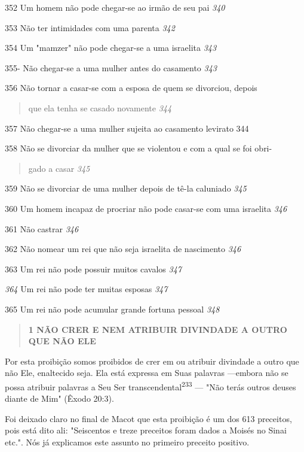 352 Um homem não pode chegar-se ao irmão de seu pai \emph{340}

353 Não ter intimidades com uma parenta \emph{342}

354 Um "mamzer" não pode chegar-se a uma israelita \emph{343}

355- Não chegar-se a uma mulher antes do casamento \emph{343}

356 Não tornar a casar-se com a esposa de quem se divorciou, depois

\begin{quote}
que ela tenha se casado novamente \emph{344}
\end{quote}

357 Não chegar-se a uma mulher sujeita ao casamento levirato 344

358 Não se divorciar da mulher que se violentou e com a qual se foi
obri-

\begin{quote}
gado a casar \emph{345}
\end{quote}

359 Não se divorciar de uma mulher depois de tê-la caluniado \emph{345}

360 Um homem incapaz de procriar não pode casar-se com uma israelita
\emph{346}

361 Não castrar \emph{346}

362 Não nomear um rei que não seja israelita de nascimento \emph{346}

363 Um rei não pode possuir muitos cavalos \emph{347}

\emph{364} Um rei não pode ter muitas esposas \emph{347}

365 Um rei não pode acumular grande fortuna pessoal \emph{348}

\begin{quote}
\textbf{1 NÃO CRER E NEM ATRIBUIR DIVINDADE A OUTRO QUE NÃO ELE}
\end{quote}

Por esta proibição somos proibidos de crer em ou atribuir divinda­de a
outro que não Ele, enaltecido seja. Ela está expressa em Suas palavras
---embora não se possa atribuir palavras a Seu Ser
transcendental\textsuperscript{233} --- "Não te­rás outros deuses diante
de Mim" (Êxodo 20:3).

Foi deixado claro no final de Macot que esta proibição é um dos 613
preceitos, pois está dito ali: "Seiscentos e treze preceitos foram dados
a Moisés no Sinai etc.". Nós já explicamos este assunto no primeiro
preceito positivo.

